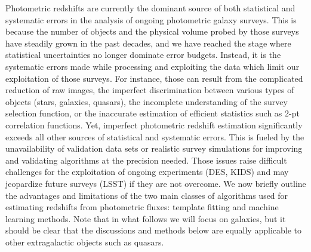 \documentclass[aps,prd,showpacs,superscriptaddress,groupedaddress]{revtex4}  %
\begin{document}
Photometric redshifts are currently the dominant source of both statistical and systematic errors in the analysis of ongoing photometric galaxy surveys.
This is because the number of objects and the physical volume probed by those surveys have steadily grown in the past decades, and we have reached the stage where statistical uncertainties no longer dominate error budgets.
Instead, it is the systematic errors made while processing and exploiting the data which limit our exploitation of those surveys.
For instance, those can result from the complicated reduction of raw images, the imperfect discrimination between various types of objects (\eg stars, galaxies, quasars), the incomplete understanding of the survey selection function, or the inaccurate estimation of efficient statistics such as 2-pt correlation functions.
Yet, imperfect photometric redshift estimation significantly exceeds all other sources of statistical and systematic errors.
This is fueled by the unavailability of validation data sets or realistic survey simulations for improving and validating \photoz algorithms at the precision needed.
Those issues raise difficult challenges for the exploitation of ongoing experiments (DES, KIDS) and may jeopardize future surveys (LSST) if they are not overcome.
We now briefly outline the advantages and limitations of the two main classes of algorithms used for estimating redshifts from photometric fluxes: template fitting and machine learning methods.
Note that in what follows we will focus on galaxies, but it should be clear that the discussions and methods below are equally applicable to other extragalactic objects such as quasars.
\end{document}
